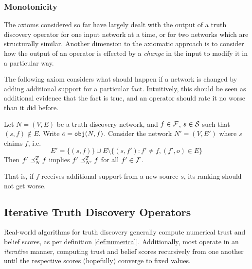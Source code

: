 \documentclass[../main.tex]{subfiles}
\begin{document}

\subsubsection*{Monotonicity}

The axioms considered so far have largely dealt with the output of a truth
discovery operator for one input network at a time, or for two networks which
are structurally similar. Another dimension to the axiomatic approach is to
consider how the output of an operator is effected by a \emph{change} in the
input to modify it in a particular way.

The following axiom considers what should happen if a network is changed by
adding additional support for a particular fact. Intuitively, this should be
seen as additional evidence that the fact is true, and an operator should rate
it no worse than it did before.


\begin{axiom}[Monotonicity]
Let $N = (V, E)$ be a truth discovery network, and $f \in \F$, $s \in \S$ such
that $(s, f) \notin E$. Write $o = \obj(N, f)$. Consider the network $N'=(V,
E')$ where $s$ claims $f$, i.e.
$$
    E' = \{(s, f)\} \cup E \setminus \{(s, f') : f' \ne f, (f', o) \in E\}
$$
Then $f' \fle_N^T f$ implies $f' \fle_{N'}^T f$ for all $f' \in \F$.

That is, if $f$ receives additional support from a new source $s$, its ranking
should not get worse.
\end{axiom}




\subsection{Iterative Truth Discovery Operators}

Real-world algorithms for truth discovery generally compute numerical trust and
belief scores, as per definition \ref{def:numerical}. Additionally, most
operate in an \emph{iterative} manner, computing trust and belief scores
recursively from one another until the respective scores (hopefully) converge
to fixed values.
\end{document}
